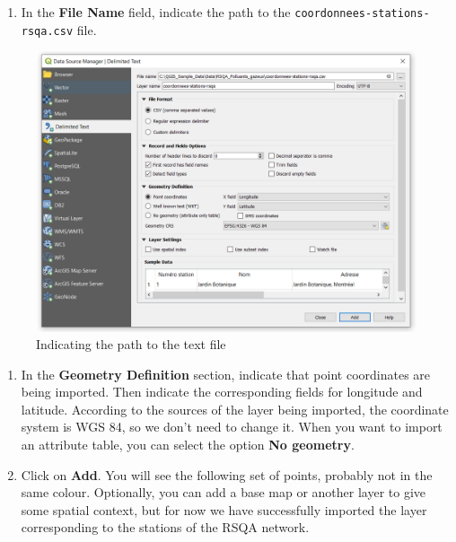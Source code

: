 \documentclass[]{book}
\providecommand{\tightlist}{%
  \setlength{\itemsep}{0pt}\setlength{\parskip}{0pt}}
\theoremstyle{definition}
\theoremstyle{definition}
\theoremstyle{definition}
\theoremstyle{remark}
\begin{document}
\begin{enumerate}
\def\labelenumi{\arabic{enumi}.}
\setcounter{enumi}{1}
\tightlist
\item
  In the \textbf{File Name} field, indicate the path to the
  \texttt{coordonnees-stations-rsqa.csv} file.
\end{enumerate}

\begin{figure}

{\centering \includegraphics[width=15.38in]{figures/Delimited_Text_Dialog_2} 

}

\caption{Indicating the path to the text file}\label{fig:unnamed-chunk-3}
\end{figure}

\begin{enumerate}
\def\labelenumi{\arabic{enumi}.}
\setcounter{enumi}{2}
\item
  In the \textbf{Geometry Definition} section, indicate that point
  coordinates are being imported. Then indicate the corresponding fields
  for longitude and latitude. According to the sources of the layer
  being imported, the coordinate system is WGS 84, so we don't need to
  change it. When you want to import an attribute table, you can select
  the option \textbf{No geometry}.
\item
  Click on \textbf{Add}. You will see the following set of points,
  probably not in the same colour. Optionally, you can add a base map or
  another layer to give some spatial context, but for now we have
  successfully imported the layer corresponding to the stations of the
  RSQA network.
\end{enumerate}
\end{document}
